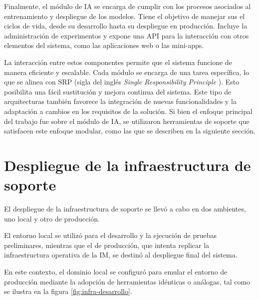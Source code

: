 Finalmente, el módulo de IA se encarga de cumplir con los procesos asociados al entrenamiento y despliegue de los modelos. Tiene el objetivo de manejar sus el ciclos de vida, desde su desarrollo hasta su despliegue en producción. Incluye la administración de experimentos y expone una API para la interacción con otros elementos del sistema, como las aplicaciones web o las mini-apps.


La interacción entre estos componentes permite que el sistema funcione de manera eficiente y escalable. Cada módulo se encarga de una tarea específica, lo que se alinea con SRP (sigla del inglés \textit{Single Responsibility Principle} \citep{soni_software_2024}). Esto posibilita una fácil sustitución y mejora continua del sistema. Este tipo de arquitecturas también favorece la integración de nuevas funcionalidades y la adaptación a cambios en los requisitos de la solución. Si bien el enfoque principal del trabajo fue sobre el módulo de IA, se utilizaron herramientas de soporte que satisfacen este enfoque modular, como las que se describen en la siguiente sección.


\section{Despliegue de la infraestructura de soporte}
\label{sec:despliegue_infraestructura}

El despliegue de la infraestructura de soporte se llevó a cabo en dos ambientes, uno local y otro de producción.

El entorno local se utilizó para el desarrollo y la ejecución de pruebas preliminares, mientras que el de producción, que intenta replicar la infraestructura operativa de la IM, se destinó al despliegue final del sistema.

En este contexto, el dominio local se configuró para emular el entorno de producción mediante la adopción de herramientas idénticas o análogas, tal como se ilustra en la figura \ref{fig:infra-desarrollo}.

